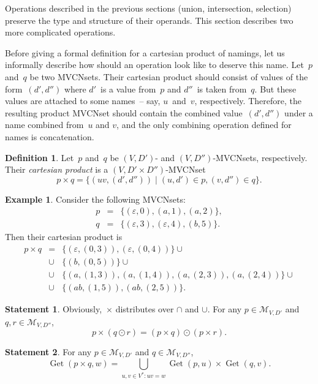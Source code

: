 \documentclass{article}
\theoremstyle{definition}
\newtheorem{Df}{Definition}
\newtheorem{St}{Statement}
\newtheorem{Ex}{Example}
\newcommand{\setcharmvcn}{M}
\newcommand{\setsymbol}[3]{\mathcal{#1}_{#2,#3}}
\newcommand{\setmvcn}[2]{\setsymbol{\setcharmvcn}{#1}{#2}}
\newcommand{\deref}{\operatorname{Get}}
\begin{document}
Operations described in the previous sections (union, intersection, selection)
preserve the type and structure of their operands. This section describes two
more complicated operations.

Before giving a formal definition for a cartesian product of namings, let us
informally describe how should an operation look like to deserve this name.
Let~$p$ and~$q$ be two MVCNsets. Their cartesian product should consist of
values of the form~$(d',d'')$ where $d'$~is a value from~$p$ and $d''$~is taken
from~$q$. But these values are attached to some names~-- say, $u$~and~$v$,
respectively.  Therefore, the resulting product MVCNset should contain the
combined value~$(d',d'')$ under a name combined from~$u$ and $v$, and the only
combining operation defined for names is concatenation.

\begin{Df}\label{df:mvcn-cartesian}
Let~$p$ and~$q$ be $(V,D')$- and $(V,D'')$-MVCNsets, respectively. Their
\emph{cartesian product} is a $(V,D'\times D'')$-MVCNset
\[
  p\times q = \{ (uv, (d',d'')) \mid (u,d')\in p, (v,d'')\in q \} .
\]
\end{Df}

\begin{Ex}\label{ex:cartesian}
Consider the following MVCNsets:
\begin{eqnarray*}
  p & = & \{ (\varepsilon, 0), (a, 1), (a, 2) \} , \\
  q & = & \{ (\varepsilon, 3), (\varepsilon, 4), (b, 5) \} .
\end{eqnarray*}
Then their cartesian product is
\begin{eqnarray*}
  p \times q & = &  \{ (\varepsilon, (0, 3)), (\varepsilon, (0, 4)) \} \cup \\
    & \cup & \{ (b, (0, 5)) \} \cup \\
    & \cup & \{ (a, (1, 3)), (a, (1, 4)), (a, (2, 3)), (a, (2, 4)) \} \cup \\
    & \cup & \{ (ab, (1, 5)), (ab, (2, 5)) \} .
\end{eqnarray*}
\end{Ex}

\begin{St}\label{st:cartesian-distributivity}
Obviously,~$\times$ distributes over $\cap$ and $\cup$.
For any $p \in \setmvcn{V}{D'}$ and $q, r \in \setmvcn{V}{D''}$,
\[
  p\times(q\odot r) = (p\times q) \odot (p\times r) .
\]
\end{St}

\begin{St}\label{st:deref-cartesian}
For any $p \in \setmvcn{V}{D'}$ and $q \in \setmvcn{V}{D''}$,
\[
  \deref(p \times q, w) =
      \bigcup_{u,v\in V^\ast: uv = w}
          \deref(p, u)
          \times
          \deref(q, v) .
\]
\end{St}
\end{document}
